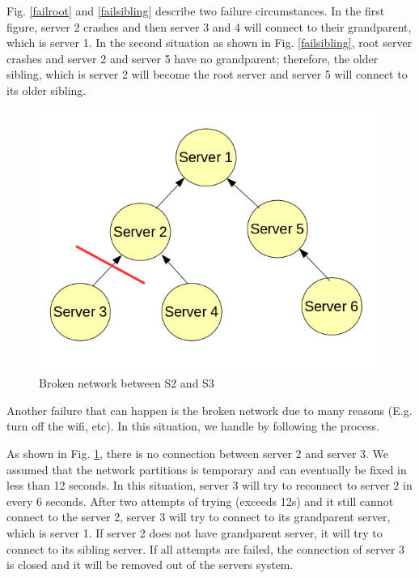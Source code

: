 \documentclass[10pt,twocolumn]{article}
\begin{document}
Fig. \ref{failroot} and \ref{failsibling} describe two failure circumstances. In the first figure, server 2 crashes and then server 3 and 4 will connect to their grandparent, which is server 1. In the second situation as shown in Fig. \ref{failsibling}, root server crashes and server 2 and server 5 have no grandparent; therefore, the older sibling, which is server 2 will become the root server and server 5 will connect to its older sibling.

\begin{figure}[h!]
\begin{center}
\includegraphics[scale=0.4]{network_broken}
\caption{Broken network between S2 and S3}
\label{broken}	
\end{center}
\end{figure}

Another failure that can happen is the broken network due to many reasons (E.g. turn off the wifi, etc). In this situation, we handle by following the process. 

As shown in Fig. \ref{broken}, there is no connection between server 2 and server 3.  We assumed that the network partitions is temporary and can eventually be fixed in less than 12 seconds. In this situation, server 3 will try to reconnect to server 2 in every 6 seconds. After two attempts of trying (exceeds 12s) and it still cannot connect to the server 2, server 3 will try to connect to its grandparent server, which is server 1. If server 2 does not have grandparent server, it will try to connect to its sibling server. If all attempts are failed, the connection of server 3 is closed and it will be removed out of the servers system.
\end{document}
